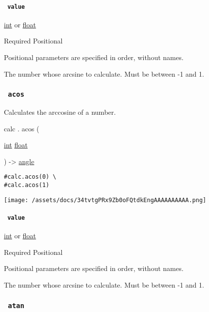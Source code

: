 \paragraph{\texorpdfstring{\texttt{\ value\ }}{ value }}\label{functions-asin-value}

\href{/docs/reference/foundations/int/}{int} {or}
\href{/docs/reference/foundations/float/}{float}

{Required} {{ Positional }}

\label{functions-asin-value-positional-tooltip}
Positional parameters are specified in order, without names.

The number whose arcsine to calculate. Must be between -1 and 1.

\subsubsection{\texorpdfstring{\texttt{\ acos\ }}{ acos }}\label{functions-acos}

Calculates the arccosine of a number.

calc { . } { acos } (

{ \href{/docs/reference/foundations/int/}{int}
\href{/docs/reference/foundations/float/}{float} }

) -\textgreater{} \href{/docs/reference/layout/angle/}{angle}

\begin{verbatim}
#calc.acos(0) \
#calc.acos(1)
\end{verbatim}

\texttt{[image: /assets/docs/34tvtgPRx9Zb0oFQtdkEngAAAAAAAAAA.png]}

\paragraph{\texorpdfstring{\texttt{\ value\ }}{ value }}\label{functions-acos-value}

\href{/docs/reference/foundations/int/}{int} {or}
\href{/docs/reference/foundations/float/}{float}

{Required} {{ Positional }}

\label{functions-acos-value-positional-tooltip}
Positional parameters are specified in order, without names.

The number whose arcsine to calculate. Must be between -1 and 1.

\subsubsection{\texorpdfstring{\texttt{\ atan\ }}{ atan }}\label{functions-atan}

